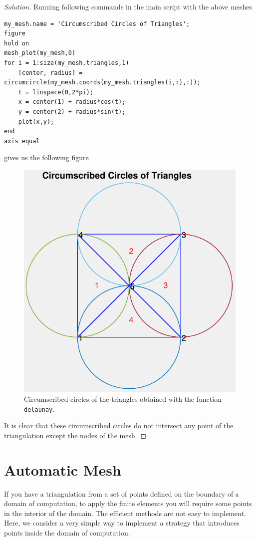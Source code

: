 \documentclass[11pt,a4paper,center,notitlepage]{article}
\numberwithin{equation}{section}
\begin{document}
\begin{proof}[Solution]
Running following commands in the main script with the above meshes
\begin{verbatim}
my_mesh.name = 'Circumscribed Circles of Triangles';
figure
hold on
mesh_plot(my_mesh,0)
for i = 1:size(my_mesh.triangles,1)
    [center, radius] = circumcircle(my_mesh.coords(my_mesh.triangles(i,:),:));
    t = linspace(0,2*pi);
    x = center(1) + radius*cos(t);
    y = center(2) + radius*sin(t);
    plot(x,y);
end
axis equal
\end{verbatim}
gives us the following figure
\begin{figure}[H]
\centering
\includegraphics[scale=0.9]{9}
\caption{Circumscribed circles of the triangles obtained with the function \texttt{delaunay}.}
\label{fig9}
\end{figure}
It is clear that these circumscribed circles do not intersect any point of the triangulation except the nodes of the mesh.
\end{proof}

\section{Automatic Mesh}\label{sec3}
If you have a triangulation from a set of points defined on the boundary of a domain of computation, to apply the finite elements you will require some points in the interior of the domain. The efficient methods are not easy to implement. Here, we consider a very simple way to implement a strategy that introduces points inside the domain of computation.
\end{document}
